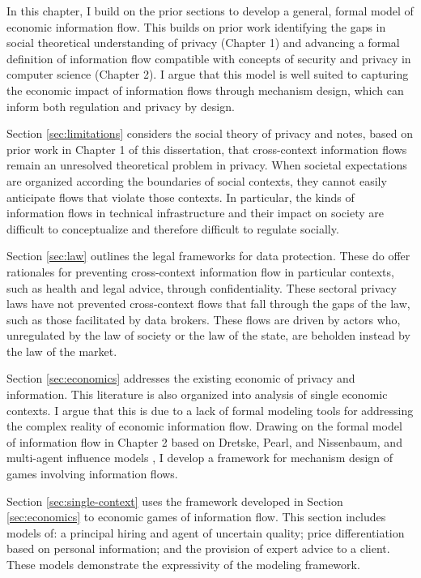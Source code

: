 \documentclass[../thesis.tex]{subfiles}
\begin{document}
In this chapter, I build on the prior sections to
develop a general, formal model of economic information
flow.
This builds on prior work identifying the gaps in
social theoretical understanding of privacy (Chapter 1)
and advancing a formal definition of information flow
compatible with concepts of security and privacy
in computer science (Chapter 2).
I argue that this model is well suited to capturing
the economic impact of information flows through
mechanism design, which can inform both regulation
and privacy by design.

Section \ref{sec:limitations} considers the social
theory of privacy and notes, based on prior work
in Chapter 1 of this dissertation, that cross-context
information flows remain an unresolved theoretical problem
in privacy.
When societal expectations are organized according
the boundaries of social contexts, they cannot easily
anticipate flows that violate those contexts.
In particular, the kinds of information flows in
technical infrastructure and their impact on society
are difficult to conceptualize and therefore
difficult to regulate socially.

Section \ref{sec:law} outlines the legal frameworks
for data protection.
These do offer rationales for preventing cross-context
information flow in particular contexts, such as
health and legal advice, through confidentiality.
These sectoral privacy laws have not prevented
cross-context flows that fall through the gaps
of the law, such as those facilitated by data brokers.
These flows are driven by actors who, unregulated
by the law of society or the law of the state,
are beholden instead by the law of the market.

Section \ref{sec:economics} addresses the existing
economic of privacy and information.
This literature is also organized into analysis
of single economic contexts.
I argue that this is due to a lack of formal modeling
tools for addressing the complex reality of economic
information flow.
Drawing on the formal model of information flow in
Chapter 2 based on Dretske, Pearl, and Nissenbaum,
and multi-agent influence models \cite{koller2003multi},
I develop a framework for mechanism design of games
involving information flows.

Section \ref{sec:single-context} uses the framework
developed in Section \ref{sec:economics} to economic
games of information flow.
This section includes models of: a principal hiring
and agent of uncertain quality; price differentiation
based on personal information; and the provision
of expert advice to a client.
These models demonstrate the expressivity of the
modeling framework.
\end{document}
